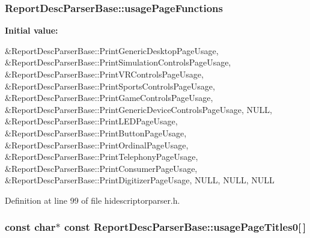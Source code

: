 \hypertarget{class_report_desc_parser_base_af91679187bb24d185979b3ec045c215b}{
\subsubsection[{usage\-Page\-Functions}]{ {\bf \-Report\-Desc\-Parser\-Base\-::usage\-Page\-Functions}}}\label{class_report_desc_parser_base_af91679187bb24d185979b3ec045c215b}
{\bfseries \-Initial value\-:}
\begin{DoxyCode}
 {
        &ReportDescParserBase::PrintGenericDesktopPageUsage,
        &ReportDescParserBase::PrintSimulationControlsPageUsage,
        &ReportDescParserBase::PrintVRControlsPageUsage,
        &ReportDescParserBase::PrintSportsControlsPageUsage,
        &ReportDescParserBase::PrintGameControlsPageUsage,
        &ReportDescParserBase::PrintGenericDeviceControlsPageUsage,
        NULL, 
        &ReportDescParserBase::PrintLEDPageUsage,
        &ReportDescParserBase::PrintButtonPageUsage,
        &ReportDescParserBase::PrintOrdinalPageUsage,
        &ReportDescParserBase::PrintTelephonyPageUsage,
        &ReportDescParserBase::PrintConsumerPageUsage,
        &ReportDescParserBase::PrintDigitizerPageUsage,
        NULL, 
        NULL, 
        NULL 
}
\end{DoxyCode}


\-Definition at line 99 of file hidescriptorparser.\-h.

\hypertarget{class_report_desc_parser_base_a9e912750d3675352614ee0b1bf73fa82}{
\subsubsection[{usage\-Page\-Titles0}]{\setlength{\rightskip}{0pt plus 5cm}const char$\ast$ const {\bf \-Report\-Desc\-Parser\-Base\-::usage\-Page\-Titles0}\mbox{[}$\,$\mbox{]}}}\label{class_report_desc_parser_base_a9e912750d3675352614ee0b1bf73fa82}


